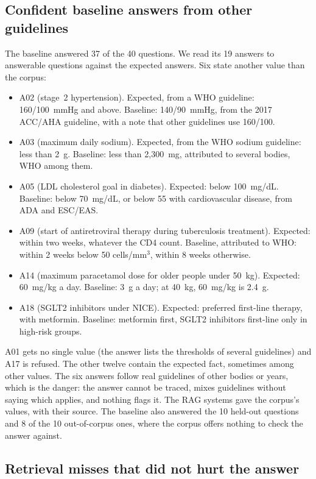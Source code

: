\subsection{Confident baseline answers from other guidelines}

The  baseline answered 37 of the 40 questions. We read its 19 answers to answerable questions against the expected answers. Six state another value than the corpus:
\begin{itemize}
\item A02 (stage~2 hypertension). Expected, from a WHO guideline: 160/100~mmHg and above. Baseline: 140/90~mmHg, from the 2017 ACC/AHA guideline, with a note that other guidelines use 160/100.
\item A03 (maximum daily sodium). Expected, from the WHO sodium guideline: less than 2~g. Baseline: less than 2,300~mg, attributed to several bodies, WHO among them.
\item A05 (LDL cholesterol goal in diabetes). Expected: below 100~mg/dL. Baseline: below 70~mg/dL, or below 55 with cardiovascular disease, from ADA and ESC/EAS.
\item A09 (start of antiretroviral therapy during tuberculosis treatment). Expected: within two weeks, whatever the CD4 count. Baseline, attributed to WHO: within 2 weeks below 50 cells/mm$^3$, within 8 weeks otherwise.
\item A14 (maximum paracetamol dose for older people under 50~kg). Expected: 60~mg/kg a day. Baseline: 3~g a day; at 40~kg, 60~mg/kg is 2.4~g.
\item A18 (SGLT2 inhibitors under NICE). Expected: preferred first-line therapy, with metformin. Baseline: metformin first, SGLT2 inhibitors first-line only in high-risk groups.
\end{itemize}
A01 gets no single value (the answer lists the thresholds of several guidelines) and A17 is refused. The other twelve contain the expected fact, sometimes among other values. The six answers follow real guidelines of other bodies or years, which is the danger: the answer cannot be traced, mixes guidelines without saying which applies, and nothing flags it. The RAG systems gave the corpus's values, with their source. The baseline also answered the 10 held-out questions and 8 of the 10 out-of-corpus ones, where the corpus offers nothing to check the answer against. 

\subsection{Retrieval misses that did not hurt the answer}

